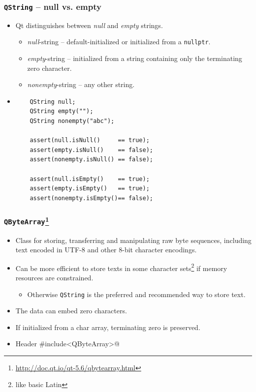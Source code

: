 \begin{frame}[fragile]
  \frametitle{\texttt{QString} -- null vs. empty}
  \small
  \begin{itemize}
    \item Qt distinguishes between {\em null} and {\em empty} strings.
    \begin{itemize}
      \item {\em null}-string -- default-initialized or initialized from a
      \texttt{nullptr}.
      \item {\em empty}-string -- initialized from a string containing only
      the terminating zero character.
      \item {\em nonempty}-string -- any other string.
    \end{itemize}
    \item
    \begin{lstlisting}
	QString null;
	QString empty("");
	QString nonempty("abc");

	assert(null.isNull()     == true);
	assert(empty.isNull()    == false);
	assert(nonempty.isNull() == false);

	assert(null.isEmpty()    == true);
	assert(empty.isEmpty()   == true);
	assert(nonempty.isEmpty()== false);
      \end{lstlisting}
  \end{itemize}
\end{frame}

\begin{frame}[fragile]
  \frametitle{\texttt{QByteArray}\footnote
    {\url{http://doc.qt.io/qt-5.6/qbytearray.html}}}
  \begin{itemize}
    \item Class for storing, transferring and manipulating raw byte sequences,
      including text encoded in UTF-8 and other 8-bit character encodings.
    \item Can be more efficient to store texts in some character sets\footnote
    {like basic Latin} if memory resources are constrained.
    \begin{itemize}
      \item Otherwise \texttt{QString} is the preferred and recommended way to
      store text.
    \end{itemize}
    \item The data can embed zero characters.
    \item If initialized from a char array, terminating zero is preserved.

    \item Header \verb@#include<QByteArray>@
  \end{itemize}
\end{frame}

